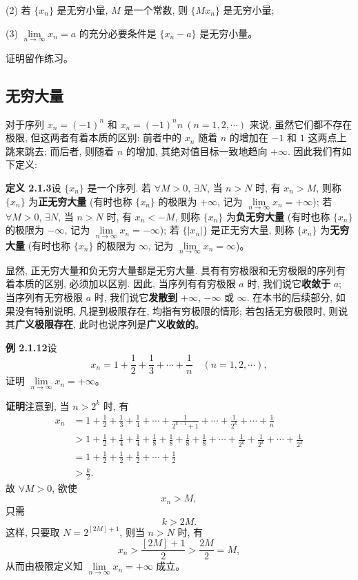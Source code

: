 \documentclass[UTF8,12pt,a4paper,fontset=fandol]{ctexart}
\begin{document}
(2) 若 $\{x_n\}$ 是无穷小量, $M$ 是一个常数, 则 $\{Mx_n\}$ 是无穷小量;

(3) $\lim\limits_{n\to\infty}x_n=a$ 的充分必要条件是 $\{x_n-a\}$ 是无穷小量。

证明留作练习。

\subsection{无穷大量}

对于序列 $x_n=(-1)^n$ 和 $x_n=(-1)^nn\ (n=1,2,\cdots)$ 来说, 虽然它们都不存在极限, 但这两者有着本质的区别: 前者中的 $x_n$ 随着 $n$ 的增加在 $-1$ 和 $1$ 这两点上跳来跳去; 而后者, 则随着 $n$ 的增加, 其绝对值目标一致地趋向 $+\infty$. 因此我们有如下定义:

\noindent\textbf{定义 2.1.3}\quad 设 $\{x_n\}$ 是一个序列. 若 $\forall M>0$, $\exists N$, 当 $n>N$ 时, 有 $x_n>M$, 则称 $\{x_n\}$ 为\textbf{正无穷大量} (有时也称 $\{x_n\}$ 的极限为 $+\infty$, 记为 $\lim\limits_{n\to\infty}x_n=+\infty$); 若 $\forall M>0$, $\exists N$, 当 $n>N$ 时, 有 $x_n<-M$, 则称 $\{x_n\}$ 为\textbf{负无穷大量} (有时也称 $\{x_n\}$ 的极限为 $-\infty$, 记为 $\lim\limits_{n\to\infty}x_n=-\infty$); 若 $\{|x_n|\}$ 是正无穷大量, 则称 $\{x_n\}$ 为\textbf{无穷大量} (有时也称 $\{x_n\}$ 的极限为 $\infty$, 记为 $\lim\limits_{n\to\infty}x_n=\infty$)。

显然, 正无穷大量和负无穷大量都是无穷大量. 具有有穷极限和无穷极限的序列有着本质的区别, 必须加以区别. 因此, 当序列有有穷极限 $a$ 时, 我们说它\textbf{收敛于} $a$; 当序列有无穷极限 $a$ 时, 我们说它\textbf{发散到} $+\infty$, $-\infty$ 或 $\infty$. 在本书的后续部分, 如果没有特别说明, 凡提到极限存在, 均指有穷极限的情形; 若包括无穷极限时, 则说其\textbf{广义极限存在}, 此时也说序列是\textbf{广义收敛的}。

\noindent\textbf{例 2.1.12}\quad 设
\[
  x_n=1+\frac12+\frac13+\cdots+\frac1n\quad(n=1,2,\cdots),
\]
证明 $\lim\limits_{n\to\infty}x_n=+\infty$。

\noindent\textbf{证明}\quad 注意到, 当 $n>2^k$ 时, 有
\[
\begin{aligned}
  x_n
  &=1+\frac12+\frac13+\frac14+\cdots+\frac1{2^{k-1}+1}
    +\cdots+\frac1{2^k}+\cdots+\frac1n\\
  &>1+\frac12+\frac14+\frac14+\frac18+\frac18+\frac18+\frac18
    +\cdots+\frac1{2^k}+\frac1{2^k}+\cdots+\frac1{2^k}\\
  &=1+\frac12+\frac12+\frac12+\cdots+\frac12\\
  &>\frac k2.
\end{aligned}
\]
故 $\forall M>0$, 欲使
\[
  x_n>M,
\]
只需
\[
  k>2M.
\]
这样, 只要取 $N=2^{[2M]+1}$, 则当 $n>N$ 时, 有
\[
  x_n>\frac{[2M]+1}{2}>\frac{2M}{2}=M,
\]
从而由极限定义知 $\lim\limits_{n\to\infty}x_n=+\infty$ 成立。
\end{document}
